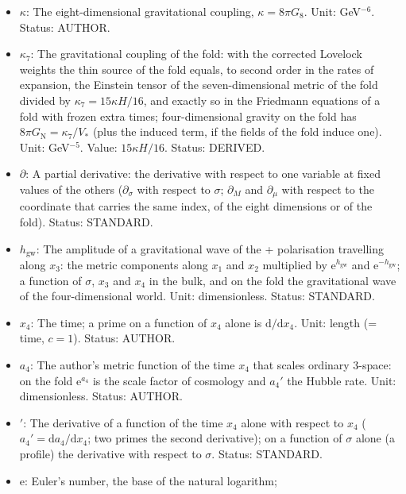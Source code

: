 \documentclass[
  10pt,
]{article}
\providecommand{\tightlist}{%
  \setlength{\itemsep}{0pt}\setlength{\parskip}{0pt}}
\begin{document}
\begin{itemize}
\tightlist
\item
  \(\kappa\): The eight-dimensional gravitational coupling,
  \(\kappa = 8\pi G_8\). Unit: GeV\(^{-6}\). Status: AUTHOR.
\item
  \(\kappa_7\): The gravitational coupling of the fold: with the
  corrected Lovelock weights the thin source of the fold equals, to
  second order in the rates of expansion, the Einstein tensor of the
  seven-dimensional metric of the fold divided by
  \(\kappa_7 = 15\kappa H/16\), and exactly so in the Friedmann
  equations of a fold with frozen extra times; four-dimensional gravity
  on the fold has \(8\pi G_{\mathrm{N}} = \kappa_7/V_*\) (plus the
  induced term, if the fields of the fold induce one). Unit:
  GeV\(^{-5}\). Value: \(15\kappa H/16\). Status: DERIVED.
\item
  \(\partial\): A partial derivative: the derivative with respect to one
  variable at fixed values of the others (\(\partial_\sigma\) with
  respect to \(\sigma\); \(\partial_M\) and \(\partial_\mu\) with
  respect to the coordinate that carries the same index, of the eight
  dimensions or of the fold). Status: STANDARD.
\item
  \(h_{\mathrm{gw}}\): The amplitude of a gravitational wave of the +
  polarisation travelling along \(x_3\): the metric components along
  \(x_1\) and \(x_2\) multiplied by \(\mathrm{e}^{h_{\mathrm{gw}}}\) and
  \(\mathrm{e}^{-h_{\mathrm{gw}}}\); a function of \(\sigma\), \(x_3\)
  and \(x_4\) in the bulk, and on the fold the gravitational wave of the
  four-dimensional world. Unit: dimensionless. Status: STANDARD.
\item
  \(x_4\): The time; a prime on a function of \(x_4\) alone is
  \(\mathrm{d}/\mathrm{d}x_4\). Unit: length (= time, \(c = 1\)).
  Status: AUTHOR.
\item
  \(a_4\): The author's metric function of the time \(x_4\) that scales
  ordinary 3-space: on the fold \(\mathrm{e}^{a_4}\) is the scale factor
  of cosmology and \(a_4'\) the Hubble rate. Unit: dimensionless.
  Status: AUTHOR.
\item
  \({}'\): The derivative of a function of the time \(x_4\) alone with
  respect to \(x_4\) (\(a_4' = \mathrm{d}a_4/\mathrm{d}x_4\); two primes
  the second derivative); on a function of \(\sigma\) alone (a profile)
  the derivative with respect to \(\sigma\). Status: STANDARD.
\item
  \(\mathrm{e}\): Euler's number, the base of the natural logarithm;

\end{itemize}
\end{document}

